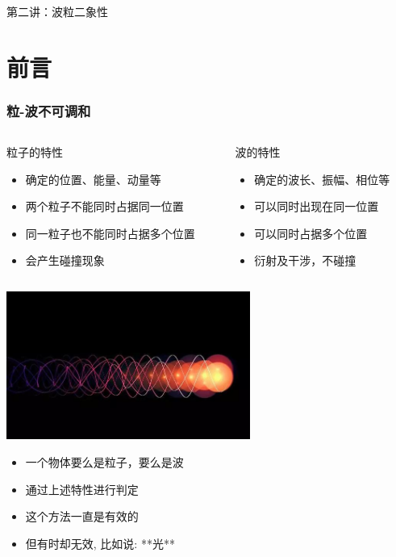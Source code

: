 
\begin{frame}
    \frametitle{}
    \begin{center}
    { {\huge 第二讲：波粒二象性}}
    \end{center}    
\end{frame}
\section{前言}
\begin{frame}
    \frametitle{粒-波不可调和}
	\begin{columns}
		\begin{column}[t]{0.46\linewidth}
			粒子的特性
			\begin{itemize}
				\item 确定的位置、能量、动量等
				\item 两个粒子不能同时占据同一位置
				\item 同一粒子也不能同时占据多个位置
				\item 会产生碰撞现象
			\end{itemize}
		\end{column}
		\begin{column}[t]{0.46\linewidth}
			波的特性
			\vspace{1ex}
			\begin{itemize}
				\item 确定的波长、振幅、相位等
				\item 可以同时出现在同一位置
				\item 可以同时占据多个位置
				\item 衍射及干涉，不碰撞
			\end{itemize}
		\end{column}
	\end{columns}
\end{frame}

\begin{frame} 
    \begin{center}
        \includegraphics[width=0.6\textwidth]{figs/2021-12-02-15-26-40.png}
    \end{center}
    \begin{itemize}
        \item 一个物体要么是粒子，要么是波
        \item 通过上述特性进行判定
        \item 这个方法一直是有效的
        \item 但有时却无效, 比如说: **光** 
    \end{itemize}
\end{frame}

